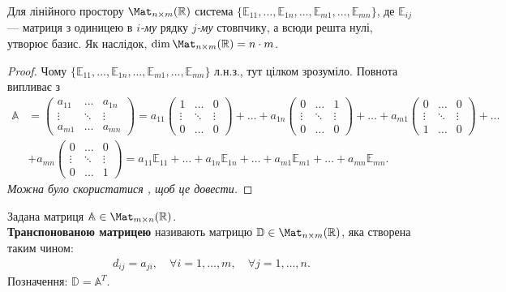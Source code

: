 \documentclass{math_library}
\begin{document}
	\begin{proposition}
	Для лінійного простору $\Mat_{n \times m}(\mathbb{R})$ система $\{\mathbb{E}_{11},\dots, \mathbb{E}_{1n},\dots, \mathbb{E}_{m1}, \dots, \mathbb{E}_{mn}\}$, де $\mathbb{E}_{ij}$ --- матриця з одиницею в $i$\textit{-му} рядку $j$\textit{-му} стовпчику, а всюди решта нулі, утворює базис. Як наслідок, $\dim \Mat_{n \times m}(\mathbb{R}) = n \cdot m$.
	\end{proposition}
	
	\begin{proof}
	Чому $\{\mathbb{E}_{11},\dots, \mathbb{E}_{1n},\dots, \mathbb{E}_{m1}, \dots, \mathbb{E}_{mn}\}$ л.н.з., тут цілком зрозуміло. Повнота випливає з
	\begin{align*}
	\mathbb{A} & = \begin{pmatrix}
	a_{11} & \dots & a_{1n} \\
	\vdots & \ddots & \vdots \\
	a_{m1} & \dots & a_{mn} 
	\end{pmatrix} = a_{11}\begin{pmatrix}
	1 & \dots & 0 \\
	\vdots & \ddots & \vdots \\
	0 & \dots & 0 
	\end{pmatrix} + \dots + a_{1n}\begin{pmatrix}
	0 & \dots & 1 \\
	\vdots & \ddots & \vdots \\
	0 & \dots & 0 
	\end{pmatrix} + \dots + a_{m1}\begin{pmatrix}
	0 & \dots & 0 \\
	\vdots & \ddots & \vdots \\
	1 & \dots & 0 
	\end{pmatrix} + \dots \\
	& + a_{mn}\begin{pmatrix}
	0 & \dots & 0 \\
	\vdots & \ddots & \vdots \\
	0 & \dots & 1 
	\end{pmatrix} = a_{11}\mathbb{E}_{11} + \dots + a_{1n}\mathbb{E}_{1n} + \dots + a_{m1}\mathbb{E}_{m1} + \dots + a_{mn}\mathbb{E}_{mn}.
	\end{align*}
	\textit{Можна було скористатися , щоб це довести.}
	\end{proof}
	
	\begin{definition}
	Задана матриця $\mathbb{A} \in \Mat_{m \times n}(\mathbb{R})$.\\
	\textbf{Транспонованою матрицею} називають матрицю $\mathbb{D} \in \Mat_{n \times m}(\mathbb{R})$, яка створена таким чином:
	\begin{align*}
	d_{ij} = a_{ji},\quad \forall i = 1,\dots,m,\quad \forall j = 1,\dots,n.
	\end{align*}
	Позначення: $\mathbb{D} = \mathbb{A}^T$.
	\end{definition}
	
\end{document}
